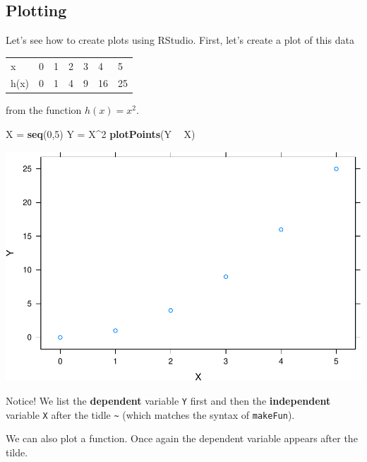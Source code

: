 \documentclass[
]{book}
\newenvironment{Shaded}{\begin{snugshade}}{\end{snugshade}}
\newcommand{\DecValTok}[1]{\textcolor[rgb]{0.00,0.00,0.81}{#1}}
\newcommand{\KeywordTok}[1]{\textcolor[rgb]{0.13,0.29,0.53}{\textbf{#1}}}
\newcommand{\NormalTok}[1]{#1}
\newcommand{\OperatorTok}[1]{\textcolor[rgb]{0.81,0.36,0.00}{\textbf{#1}}}
\newcommand{\StringTok}[1]{\textcolor[rgb]{0.31,0.60,0.02}{#1}}
\begin{document}
\hypertarget{plotting}{%
\subsection{Plotting}\label{plotting}}

Let's see how to create plots using RStudio. First, let's create a plot of this data

\begin{longtable}[]{@{}lllllll@{}}
\toprule
\endhead
x & 0 & 1 & 2 & 3 & 4 & 5\tabularnewline
h(x) & 0 & 1 & 4 & 9 & 16 & 25\tabularnewline
\bottomrule
\end{longtable}

from the function \(h(x)=x^2\).

\begin{Shaded}
\begin{Highlighting}[]
\NormalTok{X =}\StringTok{ }\KeywordTok{seq}\NormalTok{(}\DecValTok{0}\NormalTok{,}\DecValTok{5}\NormalTok{)}
\NormalTok{Y =}\StringTok{ }\NormalTok{X}\OperatorTok{^}\DecValTok{2}
\KeywordTok{plotPoints}\NormalTok{(Y }\OperatorTok{~}\StringTok{ }\NormalTok{X)}
\end{Highlighting}
\end{Shaded}

\includegraphics{_bookdown_files/math135_handbook_files/figure-latex/unnamed-chunk-65-1.pdf}

Notice! We list the \textbf{dependent} variable \texttt{Y} first and then the \textbf{independent} variable \texttt{X} after the tidle \texttt{\textasciitilde{}} (which matches the syntax of \texttt{makeFun}).

We can also plot a function. Once again the dependent variable appears after the tilde.
\end{document}
